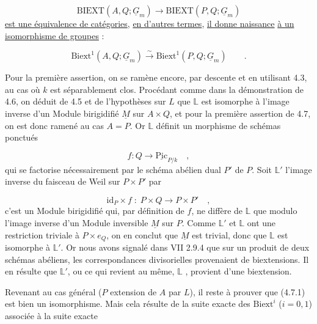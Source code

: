 \begin{equation*}
\mathrm{BIEXT}(A,Q;\underline{G}_m) \longrightarrow \mathrm{BIEXT}(P,Q;\underline{G}_m)
\end{equation*}
\underline{est une équivalence de catégories}, \underline{en d'autres termes}, \underline{il donne naissance} \underline{à un isomorphisme de groupes} :

\begin{equation}\tag{4.7.1}
\mathrm{Biext}^1(A,Q;\underline{G}_m) \stackrel{\sim}{\longrightarrow} \mathrm{Biext}^1(P,Q;\underline{G}_m) \qquad .
\end{equation}


Pour la première assertion, on se ramène encore, par descente et en utilisant 4.3, au cas où $k$ est séparablement clos. Procédant comme dans la démonstration de 4.6, on déduit de 4.5 et de l'hypothèses sur $L$ que $\mathbb{L}$ est isomorphe à l'image inverse d'un Module birigidifié $\underline{M}$ sur $A \times Q$, et pour la première assertion de 4.7, on est donc ramené au cas $A=P$. Or $\mathbb{L}$ définit un morphisme de schémas ponctués

\begin{equation*}
f:Q \longrightarrow \underline{\mathrm{Pic}}_{P/k} \quad ,
\end{equation*}
qui se factorise nécessairement par le schéma abélien dual $P'$ de $P$. Soit $\mathbb{L}'$ l'image inverse du faisceau de Weil sur $P \times P'$ par

\begin{equation*}
\mathrm{id}_P \times f \; : \; P \times Q \longrightarrow P \times P' \quad ,
\end{equation*}
c'est un Module birigidifié qui, par définition de $f$, ne diffère de $\mathbb{L}$ que modulo l'image inverse d'un Module inversible $\underline{M}$ sur $P$. Comme $\mathbb{L}'$ et $\mathbb{L}$ ont une restriction triviale à $P \times e_Q$, on en conclut que $\underline{M}$ est trivial, donc que $\mathbb{L}$ est isomorphe à $\mathbb{L}'$. Or nous avons signalé dans VII 2.9.4 que sur un produit de deux schémas abéliens, les correspondances divisorielles provenaient de biextensions. Il en résulte que $\mathbb{L}'$, ou ce qui revient au même, $\mathbb{L}$ , provient d'une biextension.

Revenant au cas général ($P$ extension de $A$ par $L$), il reste à prouver que (4.7.1) est bien un isomorphisme. Mais cela résulte de la suite exacte des $\mathrm{Biext}^i$ ($i=0,1$) associée à la suite exacte

